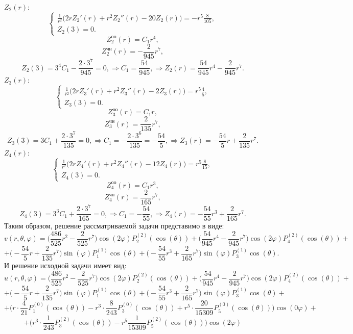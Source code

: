 \documentclass[11pt]{article}
\begin{document}
 $Z_2(r):$
 $$\begin{cases}
     \frac{1}{r^2}\Big(2rZ_2'(r)+r^2Z_2''(r)-20Z_2(r)\Big)=-r^5\frac{8}{105},\\
     Z_2(3)=0.
 \end{cases}$$
 $$Z_2^{\text{оо}}(r)=C_1r^4,$$
 $$Z_2^{\text{чн}}(r)=-\frac{2}{945}r^7,$$
 $$Z_2(3)=3^4C_1-\frac{2\cdot3^7}{945}=0, \Rightarrow C_1=\frac{54}{945}, \Rightarrow Z_2(r)=\frac{54}{945}r^4-\frac{2}{945}r^7.$$
 $Z_3(r):$
 $$\begin{cases}
     \frac{1}{r^2}\Big(2rZ_3'(r)+r^2Z_3''(r)-2Z_3(r)\Big)=r^5\frac{4}{5},\\
     Z_3(3)=0.
 \end{cases}$$
 $$Z_3^{\text{оо}}(r)=C_1r,$$
 $$Z_3^{\text{чн}}(r)=\frac{2}{135}r^7,$$
 $$Z_3(3)=3C_1+\frac{2\cdot3^7}{135}=0, \Rightarrow C_1=-\frac{2\cdot 3^6}{135}=-\frac{54}{5}, \Rightarrow Z_3(r)=-\frac{54}{5}r+\frac{2}{135}r^7.$$
 $Z_4(r):$
 $$\begin{cases}
     \frac{1}{r^2}\Big(2rZ_4'(r)+r^2Z_4''(r)-12Z_4(r)\Big)=r^5\frac{8}{15},\\
     Z_4(3)=0.
 \end{cases}$$
 $$Z_4^{\text{оо}}(r)=C_1r^3,$$
 $$Z_4^{\text{чн}}(r)=\frac{2}{165}r^7,$$
 $$Z_4(3)=3^3C_1+\frac{2\cdot3^7}{165}=0, \Rightarrow C_1=-\frac{54}{55}, \Rightarrow Z_4(r)=-\frac{54}{55}r^3+\frac{2}{165}r^7.$$
 Таким образом, решение рассматриваемой задачи представимо в виде:
 $$v(r,\theta, \varphi) = \Big( \frac{486}{525}r^2-\frac{2}{525}r^7 \Big)\cos(2\varphi)P_2^{(2)}(\cos(\theta))+\Big( \frac{54}{945}r^4-\frac{2}{945}r^7\Big)\cos(2\varphi)P_4^{(2)}(\cos(\theta))+$$$$+\Big(-\frac{54}{5}r+\frac{2}{135}r^7 \Big)\sin(\varphi)P_1^{(1)}\cos(\theta)+\Big(-\frac{54}{55}r^3+\frac{2}{165}r^7\Big)\sin(\varphi)P_3^{(1)}\cos(\theta).$$
 И решение исходной задачи имеет вид:
 $$u(r, \theta, \varphi) = \Big( \frac{486}{525}r^2-\frac{2}{525}r^7 \Big)\cos(2\varphi)P_2^{(2)}(\cos(\theta))+\Big( \frac{54}{945}r^4-\frac{2}{945}r^7\Big)\cos(2\varphi)P_4^{(2)}(\cos(\theta))+$$$$+\Big(-\frac{54}{5}r+\frac{2}{135}r^7 \Big)\sin(\varphi)P_1^{(1)}\cos(\theta)+\Big(-\frac{54}{55}r^3+\frac{2}{165}r^7\Big)\sin(\varphi)P_3^{(1)}\cos(\theta)+$$
 $$+\Big(r\cdot\frac{4}{21}P_1^{(0)}(\cos(\theta))-r^3\cdot\frac{8}{243}P_3^{(0)}(\cos(\theta))+r^5\cdot\frac{20}{15309}P_5^{(0)}(\cos(\theta))\Big)\cos(0\varphi)+$$$$+\Big(r^3\cdot\frac{1}{243}P_3^{(2)}(\cos(\theta))-r^5\frac{1}{15309}P_5^{(2)}(\cos(\theta))\Big)\cos(2\varphi)$$
\end{document}
